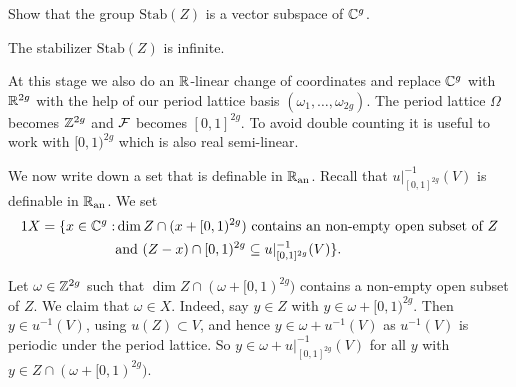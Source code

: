 \begin{exercise}
  Show that the group $\mathrm{Stab}(Z)$ is a vector subspace of
  ${\mathbb{C}}^g$. 
\end{exercise}

\begin{lemma}
  The stabilizer $\mathrm{Stab}(Z)$ is infinite. 
\end{lemma}

At this stage we also do an ${\mathbb{R}}$-linear change of coordinates and
replace ${\mathbb{C}}^g$ with ${\mathbb{R}}^{2g}$ with the help of our period lattice
basis $(\omega_1,\ldots,\omega_{2g})$.
The period lattice $\Omega$ becomes ${\mathbb{Z}}^{2g}$ and ${\mathcal F}$ becomes
$[0,1]^{2g}$. To avoid double counting it is useful to work with
$[0,1)^{2g}$ which is also real semi-linear. 

We now write down a set that is definable in ${{\mathbb{R}}_{\mathrm{an}}}$.
Recall that
 $u|_{[0,1]^{2g}}^{-1}(V)$ is definable in ${{\mathbb{R}}_{\mathrm{an}}}$.
We set
\begin{alignat*}1  
  X =  \{x \in\IC^g : &\dim Z\cap(x+[0,1)^{2g})\text{ contains an
    non-empty open subset of $Z$}\\
  &\text{and } (Z-x)\cap [0,1)^{2g} \subset u|_{[0,1]^{2g}}^{-1}(V)\}. 
\end{alignat*}


Let $\omega \in{\mathbb{Z}}^{2g}$
such that $\dim Z\cap (\omega+[0,1)^{2g})$ contains a non-empty open
subset of $Z$.
We claim that $\omega\in X$.
Indeed, say $y\in Z$ with $y\in \omega+[0,1)^{2g}$.
Then $y\in u^{-1}(V)$, using $u(Z)\subset V$, and hence
$y \in \omega+u^{-1}(V)$ as $u^{-1}(V)$ is periodic under the period
lattice. So $y \in \omega+u|_{[0,1]^{2g}}^{-1}(V)$
for all $y$ with $y\in Z\cap (\omega+[0,1)^{2g})$. 

